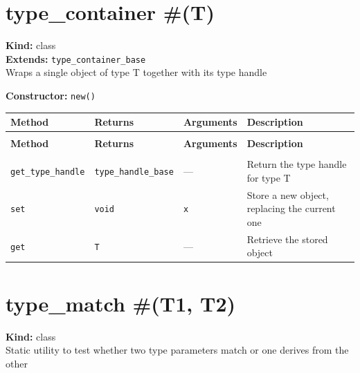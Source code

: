 \documentclass[11pt,letterpaper]{report}
\begin{document}
\section{type\_container \#(T)}
\label{cls:typecontainerT}

\noindent\textbf{Kind:} class\\
\noindent\textbf{Extends:} \texttt{type\_container\_base}\\
\noindent Wraps a single object of type T together with its type handle

\noindent\textbf{Constructor:} \texttt{new()}

\begin{xltabular}{\linewidth}{>{\small}p{1.35in} >{\small}p{1.25in} >{\small}p{0.95in} >{\small}X}
\toprule
\textbf{Method} & \textbf{Returns} & \textbf{Arguments} & \textbf{Description} \\
\midrule
\endfirsthead
{} \\
\midrule
\textbf{Method} & \textbf{Returns} & \textbf{Arguments} & \textbf{Description} \\
\midrule
\endhead
\midrule
{} \\
\endfoot
\bottomrule
\endlastfoot
\texttt{get\_type\_handle} & \texttt{type\_handle\_base} & --- & Return the type handle for type T \\
\texttt{set} & \texttt{void} & \texttt{x} & Store a new object, replacing the current one \\
\texttt{get} & \texttt{T} & --- & Retrieve the stored object \\
\end{xltabular}

\section{type\_match \#(T1, T2)}
\label{cls:typematchT1T2}

\noindent\textbf{Kind:} class\\
\noindent Static utility to test whether two type parameters match or one derives from the other
\end{document}
